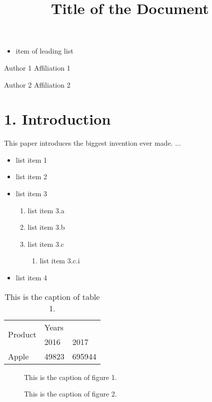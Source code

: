 \documentclass[11pt,a4paper]{article}
\title{Title of the Document}
\begin{document}
\maketitle

\begin{itemize}
\item item of leading list
\end{itemize}

Author 1
Affiliation 1

Author 2
Affiliation 2

\section{1. Introduction}

This paper introduces the biggest invention ever made. ...

\begin{itemize}
\item list item 1
\item list item 2
\item list item 3
  \begin{enumerate}
\item list item 3.a
\item list item 3.b
\item list item 3.c
    \begin{enumerate}
\item list item 3.c.i
    \end{enumerate}
  \end{enumerate}
\item list item 4
\end{itemize}

\begin{table}[h]
\caption{This is the caption of table 1.}
\begin{tabular}{lll}
\toprule
\multirow{2}{*}{Product} & \multicolumn{2}{l}{Years} \\
 & 2016 & 2017 \\
Apple & 49823 & 695944 \\
\bottomrule
\end{tabular}
\end{table}

\begin{figure}[h]
\caption{This is the caption of figure 1.}
\end{figure}

\begin{figure}[h]
\caption{This is the caption of figure 2.}
\end{figure}
\end{document}

